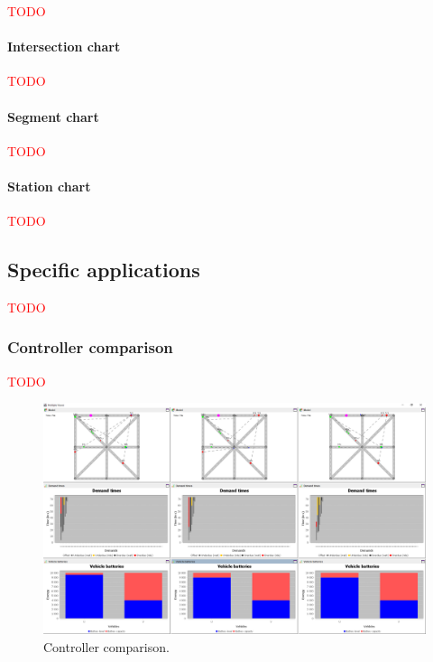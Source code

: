 \documentclass[10pt,twocolumn]{article}
\begin{document}
\textcolor{red}{TODO}

\paragraph{Intersection chart}

\textcolor{red}{TODO}

\paragraph{Segment chart}

\textcolor{red}{TODO}

\paragraph{Station chart}

\textcolor{red}{TODO}

\subsection{Specific applications}
\label{sec:application}

\textcolor{red}{TODO}

\subsubsection{Controller comparison}
\label{sec:controller-comparison}

\textcolor{red}{TODO}

\begin{figure}[!ht]
    \includegraphics[width=\columnwidth]{../../screenshots/controller-comparison.png}
    \caption{Controller comparison.}
    \label{fig:controller-comparison}
\end{figure}
\end{document}
